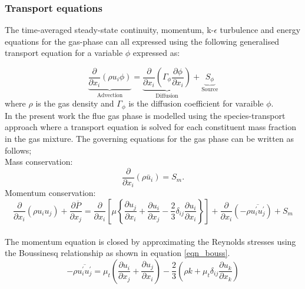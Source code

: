 \documentclass{webofc}
\begin{document}
\subsubsection{Transport equations}
The time-averaged steady-state continuity, momentum, k-$\epsilon$ turbulence  and energy equations for the gas-phase can all expressed using the following generalised transport equation for a variable $\phi$ expressed as:

\begin{equation}\label{eqn_general}
\underbrace{\frac{\partial}{\partial x_{i}}(\rho u_{i}\phi)}_{\text{Advection}}= \underbrace{\frac{\partial}{\partial x_{i}}(\Gamma_{\phi}\frac{\partial \phi}{\partial x_{i}})}_{\text{Diffusion}}+\underbrace{S_{\phi}}_{\text{Source}} 
\end{equation}
where $\rho$ is the gas density and $\Gamma_{\phi}$ is the diffusion coefficient for varaible $\phi$.\\

In the present work the flue gas phase is modelled using the species-transport approach where a transport equation is solved for each constituent mass fraction in the gas mixture. The governing equations for the gas phase can be written as follows;\\

Mass conservation:
\begin{equation}\label{eqn_RANS_mass}
\frac{\partial}{\partial x_{i}}(\rho \bar{u}_{i})=S_{m}.
\end{equation}
Momentum conservation:
\\
\begin{equation}\label{eqn_momentum}
\frac{\partial}{\partial x_{i}}(\rho u_{i}u_{j})+\frac{\partial \overline{P}}{\partial x_{j}}=\frac{\partial}{\partial x_{i}}\left[\mu\left\{\frac{\partial u_{j}}{\partial x_{i}}+\frac{\partial u_{i}}{\partial x_{j}}-\frac{2}{3}\delta_{ij}\frac{\partial u_{i}}{\partial x_{i}}\right\}\right]+\frac{\partial}{\partial x_{i}}(-\rho\overline{u_{i}^{'}u_{j}^{'}})+S_m
\end{equation}\\

The momentum equation is closed by approximating the Reynolds stresses using the Boussinesq relationship as shown in equation \eqref{eqn_bouss}.
\begin{equation}\label{eqn_bouss}
-\rho\overline{u_{i}^{'}u_{j}^{'}}=\mu_{t}\left(\frac{\partial u_{i}}{\partial x_{j}}+\frac{\partial u_{j}}{\partial x_{i}}\right)-\frac{2}{3}\left(\rho k+\mu_{t}\delta_{ij}\frac{\partial u_{k}}{\partial x_{k}}\right)
\end{equation}
\end{document}
